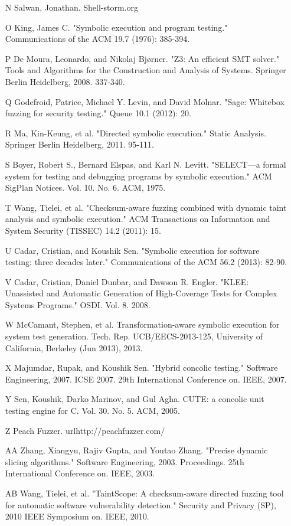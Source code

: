 \documentclass[11pt,expanded,copyright]{fsuthesis}
\begin{document}
\begin{itemize}
	\item [N] Salwan, Jonathan. Shell-storm.org %
	\item [O] King, James C. "Symbolic execution and program testing." Communications of the ACM 19.7 (1976): 385-394.
	\item [P] De Moura, Leonardo, and Nikolaj Bjørner. "Z3: An efficient SMT solver." Tools and Algorithms for the Construction and Analysis of Systems. Springer Berlin Heidelberg, 2008. 337-340.
	\item [Q] Godefroid, Patrice, Michael Y. Levin, and David Molnar. "Sage: Whitebox fuzzing for security testing." Queue 10.1 (2012): 20.
	\item [R] Ma, Kin-Keung, et al. "Directed symbolic execution." Static Analysis. Springer Berlin Heidelberg, 2011. 95-111.
	\item [S] Boyer, Robert S., Bernard Elspas, and Karl N. Levitt. "SELECT—a formal system for testing and debugging programs by symbolic execution." ACM SigPlan Notices. Vol. 10. No. 6. ACM, 1975.
	\item [T] Wang, Tielei, et al. "Checksum-aware fuzzing combined with dynamic taint analysis and symbolic execution." ACM Transactions on Information and System Security (TISSEC) 14.2 (2011): 15.
	\item [U] Cadar, Cristian, and Koushik Sen. "Symbolic execution for software testing: three decades later." Communications of the ACM 56.2 (2013): 82-90.
	\item [V] Cadar, Cristian, Daniel Dunbar, and Dawson R. Engler. "KLEE: Unassisted and Automatic Generation of High-Coverage Tests for Complex Systems Programs." OSDI. Vol. 8. 2008.
	\item [W] McCamant, Stephen, et al. Transformation-aware symbolic execution for system test generation. Tech. Rep. UCB/EECS-2013-125, University of California, Berkeley (Jun 2013), 2013.
	\item [X] Majumdar, Rupak, and Koushik Sen. "Hybrid concolic testing." Software Engineering, 2007. ICSE 2007. 29th International Conference on. IEEE, 2007.
	\item [Y] Sen, Koushik, Darko Marinov, and Gul Agha. CUTE: a concolic unit testing engine for C. Vol. 30. No. 5. ACM, 2005.
	\item [Z] Peach Fuzzer. url{http://peachfuzzer.com/}
	\item [AA] Zhang, Xiangyu, Rajiv Gupta, and Youtao Zhang. "Precise dynamic slicing algorithms." Software Engineering, 2003. Proceedings. 25th International Conference on. IEEE, 2003.
	\item [AB] Wang, Tielei, et al. "TaintScope: A checksum-aware directed fuzzing tool for automatic software vulnerability detection." Security and Privacy (SP), 2010 IEEE Symposium on. IEEE, 2010.

\end{itemize}
\end{document}
